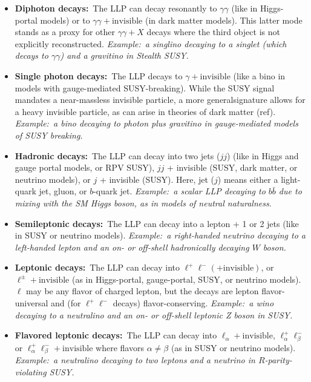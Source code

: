 \begin{itemize}
\item {\bf Diphoton decays:}~The LLP can decay resonantly to
  $\gamma\gamma$ (like in Higgs-portal models) or to
  $\gamma\gamma+\mathrm{invisible}$ (in dark matter models). This
  latter mode stands as a proxy for other $\gamma\gamma+X$ decays
  where the third object is not explicitly reconstructed. \emph{Example:~a 
  singlino decaying to a singlet (which decays to $\gamma\gamma$) and 
  a gravitino in Stealth SUSY.}

\item {\bf Single photon decays:}~The LLP decays to
  $\gamma+\mathrm{invisible}$ (like a bino in models with
  gauge-mediated SUSY-breaking).  While the SUSY signal mandates a
  near-massless invisible particle, a more generalsignature allows for
  a heavy invisible particle, as can arise in theories of dark matter
  (ref). \emph{Example:~a bino decaying to photon plus gravitino in gauge-mediated
  models of SUSY breaking.}

\item {\bf Hadronic decays:}~The LLP can decay into two jets ($jj$)
  (like in Higgs and gauge portal models, or RPV SUSY), $jj$ +
  invisible (SUSY, dark matter, or neutrino models), or $j$ +
  invisible (SUSY). Here, jet ($j$) means either a light-quark jet,
  gluon, or $b$-quark jet. \emph{Example:~a scalar LLP decaying to $b\bar{b}$
  due to mixing with the SM Higgs boson, as in models of
  neutral naturalness}. 

\item {\bf Semileptonic decays:}~The LLP can decay into a lepton + 1
  or 2 jets (like in SUSY or neutrino models). \emph{Example:~a right-handed neutrino decaying to a left-handed
   lepton and an on- or off-shell hadronically decaying $W$ boson. }

\item {\bf Leptonic decays:}~The LLP can decay into
  $\ell^+\ell^-(+\mathrm{invisible})$, or
  $\ell^\pm+\mathrm{invisible}$ (as in Higgs-portal, gauge-portal,
  SUSY, or neutrino models). $\ell$ may be any flavor of charged
  lepton, but the decays are lepton flavor-universal and (for
  $\ell^+\ell^-$ decays) flavor-conserving. \emph{Example:~a wino decaying
  to a neutralino and an on- or off-shell leptonic Z boson in SUSY.}

\item {\bf Flavored leptonic decays:}~The LLP can decay into
  $\ell_\alpha+\mathrm{invisible}$, $\ell_\alpha^+\ell_\beta^-$ or
  $\ell_\alpha^+\ell_\beta^-+\mathrm{invisible}$ where flavors
  $\alpha\neq\beta$ (as in SUSY or neutrino models). \emph{Example:~a neutralino decaying to two
   leptons and a neutrino in $R$-parity-violating SUSY.}
\end{itemize}

